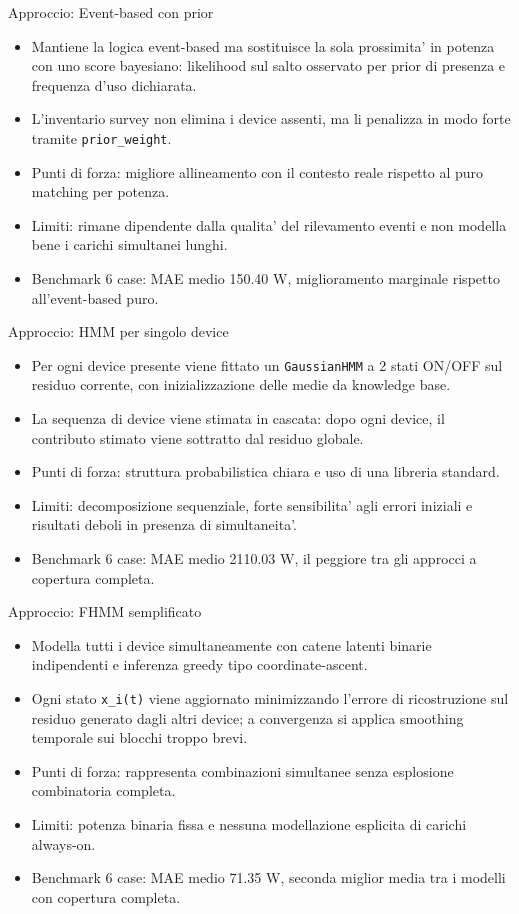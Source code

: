 \documentclass[aspectratio=169]{beamer}
\newcommand{\code}[1]{\texttt{#1}}
\begin{document}
\begin{frame}{Approccio: Event-based con prior}
\small
\begin{itemize}
  \item Mantiene la logica event-based ma sostituisce la sola prossimita' in potenza con uno score bayesiano: likelihood sul salto osservato per prior di presenza e frequenza d'uso dichiarata.
  \item L'inventario survey non elimina i device assenti, ma li penalizza in modo forte tramite \code{prior\_weight}.
  \item Punti di forza: migliore allineamento con il contesto reale rispetto al puro matching per potenza.
  \item Limiti: rimane dipendente dalla qualita' del rilevamento eventi e non modella bene i carichi simultanei lunghi.
  \item Benchmark 6 case: MAE medio 150.40 W, miglioramento marginale rispetto all'event-based puro.
\end{itemize}
\end{frame}

\begin{frame}{Approccio: HMM per singolo device}
\small
\begin{itemize}
  \item Per ogni device presente viene fittato un \code{GaussianHMM} a 2 stati ON/OFF sul residuo corrente, con inizializzazione delle medie da knowledge base.
  \item La sequenza di device viene stimata in cascata: dopo ogni device, il contributo stimato viene sottratto dal residuo globale.
  \item Punti di forza: struttura probabilistica chiara e uso di una libreria standard.
  \item Limiti: decomposizione sequenziale, forte sensibilita' agli errori iniziali e risultati deboli in presenza di simultaneita'.
  \item Benchmark 6 case: MAE medio 2110.03 W, il peggiore tra gli approcci a copertura completa.
\end{itemize}
\end{frame}

\begin{frame}{Approccio: FHMM semplificato}
\small
\begin{itemize}
  \item Modella tutti i device simultaneamente con catene latenti binarie indipendenti e inferenza greedy tipo coordinate-ascent.
  \item Ogni stato \code{x\_i(t)} viene aggiornato minimizzando l'errore di ricostruzione sul residuo generato dagli altri device; a convergenza si applica smoothing temporale sui blocchi troppo brevi.
  \item Punti di forza: rappresenta combinazioni simultanee senza esplosione combinatoria completa.
  \item Limiti: potenza binaria fissa e nessuna modellazione esplicita di carichi always-on.
  \item Benchmark 6 case: MAE medio 71.35 W, seconda miglior media tra i modelli con copertura completa.
\end{itemize}
\end{frame}
\end{document}

